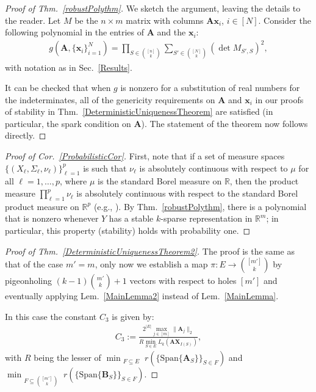 \documentclass[9pt,twocolumn]{pnas-new}
\begin{document}
\begin{proof}[Proof of Thm.~\ref{robustPolythm}]
We sketch the argument, leaving the details to the reader.
Let $M$ be the $n \times m$ matrix with columns $\mathbf{A}\mathbf{x}_i$, $i \in [N]$.  Consider the following polynomial \cite[Sec.~IV]{Hillar15} in the entries of $\mathbf{A}$ and the $\mathbf{x}_i$:
\begin{align*}
g(\mathbf{A}, \{\mathbf{x}_i\}_{i=1}^N) = \prod_{S \in {[n] \choose k}} \sum_{S' \in {[N] \choose k}} (\det M_{S',S})^2,
\end{align*}
with notation as in Sec.~\ref{Results}.  

It can be checked that when $g$ is nonzero for a substitution of real numbers for the indeterminates, all of the genericity requirements on $\mathbf{A}$ and $\mathbf{x}_i$ in our proofs of stability in Thm.~\ref{DeterministicUniquenessTheorem} are satisfied (in particular, the spark condition on $\mathbf{A}$). The statement of the theorem now follows directly.
\end{proof}

\begin{proof}[Proof of Cor.~\ref{ProbabilisticCor}]
First, note that if a set of measure spaces $\{(X_{\ell}, \Sigma_{\ell}, \nu_{\ell})\}_{\ell=1}^p$ is such that $\nu_{\ell}$ is absolutely continuous with respect to $\mu$ for all $\ell = 1, \ldots, p$, where $\mu$ is the standard Borel measure on $\mathbb{R}$, then the product measure $\prod_{\ell=1}^p \nu_{\ell}$ is absolutely continuous with respect to the standard Borel product measure on $\mathbb{R}^p$ (e.g.,  \cite{folland2013real}). By Thm.~\ref{robustPolythm}, there is a polynomial that is nonzero whenever $Y$ has a stable $k$-sparse representation in $\mathbb R^m$; in particular, this property (stability) holds with probability one.
\end{proof}

\begin{proof}[Proof of Thm.~\ref{DeterministicUniquenessTheorem2}]
The proof is the same as that of the case $m' = m$, only now we establish a map $\pi: E \to {[m'] \choose k}$ by pigeonholing $(k-1){m' \choose k} + 1$ vectors with respect to holes $[m']$ and eventually applying Lem.~\ref{MainLemma2} instead of Lem.~\ref{MainLemma}. 

In this case the constant $C_3$ is given by:
\begin{align}\label{Cdefm'}
C_3 := \frac{2^{|E|} \max_{j \in [m]} \|\mathbf{A}_j\|_2}{ R \min_{S \in E} L_k(\mathbf{AX}_{I(S)}) },
\end{align}
%
with $R$ being the lesser of $\min_{\substack{F \subseteq E}} r( \{ \text{Span}\{\mathbf{A}_{S}\} \}_{S \in F})$ and $\min_{\substack{F \subseteq {[m'] \choose k}}} r( \{ \text{Span}\{\mathbf{B}_{S}\} \}_{S \in F})$.
\end{proof}
\end{document}
